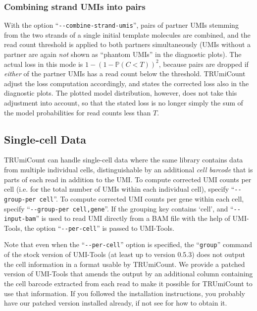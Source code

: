 \documentclass[a4paper]{scrartcl}
\makeatletter
\let\subsection@phlo\subsection
\renewcommand\subsection{\needspace{5\baselineskip}\subsection@phlo}
\newcommand{\ddarg}[1]{\texttt{-{}-#1}}
\DeclareRobustCommand*{\nameref}[1]{%
      \textit{\my@nameref{#1}}%
    }%
\makeatother
\begin{document}
\subsubsection*{Combining strand UMIs into pairs}

With the option ``\ddarg{combine-strand-umis}'', pairs of partner UMIs stemming from the two strands of a single initial template molecules are combined, and the read count threshold is applied to both partners simultaneously (UMIs without a partner are again \emph{not} shown as ``phantom UMIs'' in the diagnostic plots). The actual loss in this mode is $1 - (1-\mathbb{P}(C < T))^2$, because pairs are dropped if \emph{either} of the partner UMIs has a read count below the threshold. TRUmiCount adjust the loss computation accordingly, and states the corrected loss also in the diagnostic plots. The plotted model distribution, however, does not take this adjustment into account, so that the stated loss is no longer simply the sum of the model probabilities for read counts less than $T$.

\subsection{Single-cell Data}\label{single-cell}

TRUmiCount can handle single-cell data where the same library contains data from multiple individual cells, distinguishable by an additional \emph{cell barcode} that is parts of each read in addition to the UMI. To compute corrected UMI counts per cell (i.e. for the total number of UMIs within each individual cell), specify ``\ddarg{group-per cell}''. To compute corrected UMI counts per gene within each cell, specify ``\ddarg{group-per cell,gene}''. If the grouping key contains `cell', and ``\ddarg{input-bam}'' is used to read UMI directly from a BAM file with the help of UMI-Tools, the option ``\ddarg{per-cell}'' is passed to UMI-Tools. 

Note that even when the ``\ddarg{per-cell}'' option is specified, the ``\texttt{group}'' command of the stock version of UMI-Tools (at least up to version 0.5.3) does not output the cell information in a format usable by TRUmiCount. We provide a patched version of UMI-Tools that amends the output by an additional column containing the cell barcode extracted from each read to make it possible for TRUmiCount to use that information. If you followed the installation instructions, you probably have our patched version installed already, if not see \nameref{installation} for how to obtain it.
\end{document}
